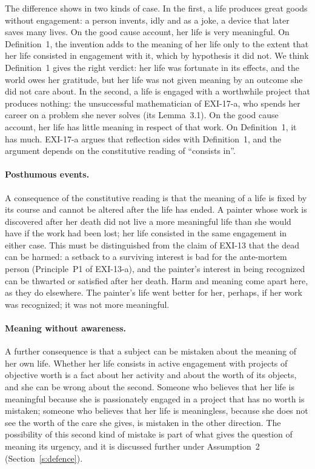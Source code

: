The difference shows in two kinds of case. In the first, a life produces great goods without engagement: a person invents, idly and as a joke, a device that later saves many lives. On the good cause account, her life is very meaningful. On Definition~1, the invention adds to the meaning of her life only to the extent that her life consisted in engagement with it, which by hypothesis it did not. We think Definition~1 gives the right verdict: her life was fortunate in its effects, and the world owes her gratitude, but her life was not given meaning by an outcome she did not care about. In the second, a life is engaged with a worthwhile project that produces nothing: the unsuccessful mathematician of EXI-17-a, who spends her career on a problem she never solves (its Lemma~3.1). On the good cause account, her life has little meaning in respect of that work. On Definition~1, it has much. EXI-17-a argues that reflection sides with Definition~1, and the argument depends on the constitutive reading of \enquote{consists in}.

\paragraph{Posthumous events.} A consequence of the constitutive reading is that the meaning of a life is fixed by its course and cannot be altered after the life has ended. A painter whose work is discovered after her death did not live a more meaningful life than she would have if the work had been lost; her life consisted in the same engagement in either case. This must be distinguished from the claim of EXI-13 that the dead can be harmed: a setback to a surviving interest is bad for the ante-mortem person (Principle~P1 of EXI-13-a), and the painter's interest in being recognized can be thwarted or satisfied after her death. Harm and meaning come apart here, as they do elsewhere. The painter's life went better for her, perhaps, if her work was recognized; it was not more meaningful.

\paragraph{Meaning without awareness.} A further consequence is that a subject can be mistaken about the meaning of her own life. Whether her life consists in active engagement with projects of objective worth is a fact about her activity and about the worth of its objects, and she can be wrong about the second. Someone who believes that her life is meaningful because she is passionately engaged in a project that has no worth is mistaken; someone who believes that her life is meaningless, because she does not see the worth of the care she gives, is mistaken in the other direction. The possibility of this second kind of mistake is part of what gives the question of meaning its urgency, and it is discussed further under Assumption~2 (Section~\ref{s:defence}).

